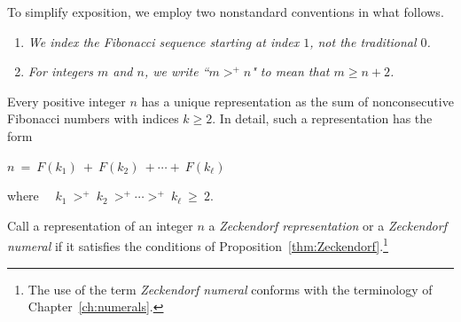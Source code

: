 \medskip

To simplify exposition, we employ two nonstandard conventions in what follows.
\begin{enumerate}
\item
{\em We index the Fibonacci sequence starting at index $1$, not the traditional $0$.}
\item
{\em For integers $m$ and $n$, we write ``$m >^+ n$" to mean that $m \geq n+2$.}
\end{enumerate}


\begin{prop}
\label{thm:Zeckendorf}
Every positive integer $n$ has a unique representation as the sum of nonconsecutive Fibonacci numbers with indices $k \geq 2$.  In detail, such a representation has the form

\smallskip

\hspace*{.25in} $n \ = \ F(k_1) \ + \ F(k_2) \ + \cdots + \ F(k_\ell)$

\smallskip

\noindent
where \ \ $k_1 \ >^+ \ k_2 \ >^+ \cdots >^+ \ k_\ell \ \geq \ 2$.
\end{prop}


\bigskip

\noindent {}
\bigskip


\noindent
Call a representation of an integer $n$ a {\it Zeckendorf representation} or a {\it Zeckendorf numeral} if it satisfies the conditions of Proposition~\ref{thm:Zeckendorf}.\footnote{The use of the term {\it Zeckendorf numeral} conforms with the terminology of Chapter~\ref{ch:numerals}.}

\medskip


